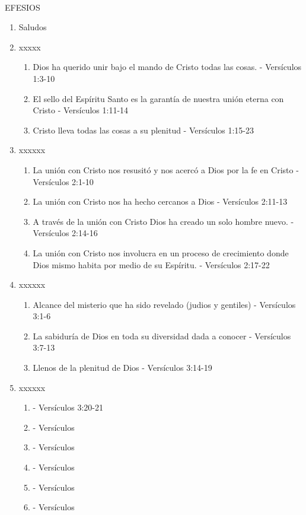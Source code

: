 \documentclass[9pt,letterpaper]{article}
\author{Ciencias}
\begin{document}
	\\
	{\large EFESIOS}\\
	
	\begin{enumerate}
		\item Saludos
		\item  xxxxx
		\begin{enumerate}
			\item Dios ha querido unir bajo el mando de Cristo todas las cosas. - Versículos 1:3-10
			\item El sello del Espíritu Santo es la garantía de nuestra unión eterna con Cristo - Versículos 1:11-14
			\item Cristo lleva todas las cosas a su plenitud - Versículos 1:15-23
		\end{enumerate}
		\item xxxxxx
		\begin{enumerate}
			\item La unión con Cristo nos resusitó y nos acercó a Dios por la fe en Cristo - Versículos 2:1-10
			\item La unión con Cristo nos ha hecho cercanos a Dios - Versículos 2:11-13
			\item A través de la unión con Cristo Dios ha creado un solo hombre nuevo. - Versículos 2:14-16
			\item La unión con Cristo nos involucra en un proceso de crecimiento donde Dios mismo habita por medio de su Espíritu. - Versículos 2:17-22
		\end{enumerate}
		\item xxxxxx
		\begin{enumerate}
			\item Alcance del misterio que ha sido revelado (judios y gentiles) - Versículos 3:1-6
			\item La sabiduría de Dios en toda su diversidad dada a conocer  - Versículos 3:7-13
			\item Llenos de la plenitud de Dios - Versículos 3:14-19
		\end{enumerate}
		\item xxxxxx
		\begin{enumerate}
			\item  - Versículos 3:20-21
			\item  - Versículos 
			\item  - Versículos 
			\item  - Versículos 
			\item  - Versículos 
			\item  - Versículos 

\end{enumerate}
\end{enumerate}
\end{document}
